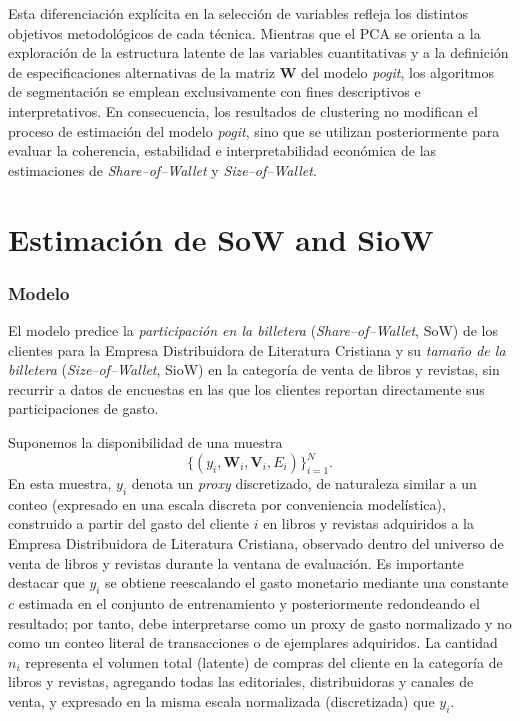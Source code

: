     Esta diferenciación explícita en la selección de variables refleja los distintos objetivos metodológicos de cada técnica. Mientras que el PCA se orienta a la exploración de la estructura latente de las variables cuantitativas y a la definición de especificaciones alternativas de la matriz $\mathbf{W}$ del modelo \emph{pogit}, los algoritmos de segmentación se emplean exclusivamente con fines descriptivos e interpretativos. En consecuencia, los resultados de clustering no modifican el proceso de estimación del modelo \emph{pogit}, sino que se utilizan posteriormente para evaluar la coherencia, estabilidad e interpretabilidad económica de las estimaciones de \emph{Share--of--Wallet} y \emph{Size--of--Wallet}.

\section{Estimación de SoW and SioW}

\subsubsection{Modelo}
    El modelo predice la \emph{participación en la billetera} (\emph{Share--of--Wallet}, SoW) de los clientes para la Empresa Distribuidora de Literatura Cristiana y su \emph{tamaño de la billetera} (\emph{Size--of--Wallet}, SioW) en la categoría de venta de libros y revistas, sin recurrir a datos de encuestas en las que los clientes reportan directamente sus participaciones de gasto.
    
    Suponemos la disponibilidad de una muestra
    \[
    \{(y_i, \boldsymbol{W}_i, \boldsymbol{V}_i, E_i)\}_{i=1}^N.
    \]
    En esta muestra, \(y_i\) denota un \emph{proxy} discretizado, de naturaleza similar a un conteo (expresado en una escala discreta por conveniencia modelística), construido a partir del gasto del cliente \(i\) en libros y revistas adquiridos a la Empresa Distribuidora de Literatura Cristiana, observado dentro del universo de venta de libros y revistas durante la ventana de evaluación. Es importante destacar que \(y_i\) se obtiene reescalando el gasto monetario mediante una constante \(c\) estimada en el conjunto de entrenamiento y posteriormente redondeando el resultado; por tanto, debe interpretarse como un proxy de gasto normalizado y no como un conteo literal de transacciones o de ejemplares adquiridos. La cantidad \(n_i\) representa el volumen total (latente) de compras del cliente en la categoría de libros y revistas, agregando todas las editoriales, distribuidoras y canales de venta, y expresado en la misma escala normalizada (discretizada) que \(y_i\).
    
